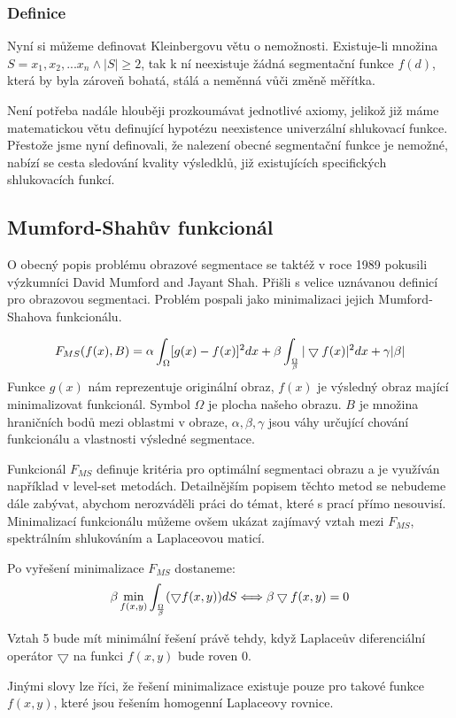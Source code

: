 \documentclass[czech, master, public, dept460, male, cpdeclaration, oneside]{diploma}
\begin{document}
\subsubsection{Definice}
Nyní si můžeme definovat Kleinbergovu větu o nemožnosti. Existuje-li množina $S = {x_1, x_2, ... x_n} \wedge |S|  \geq 2$, tak k ní neexistuje žádná segmentační funkce $f(d)$, která by byla zároveň bohatá, stálá a neměnná vůči změně měřítka.\par
Není potřeba nadále hlouběji prozkoumávat jednotlivé axiomy, jelikož již máme matematickou větu definující hypotézu neexistence univerzální shlukovací funkce. Přestože jsme nyní definovali, že nalezení obecné segmentační funkce je nemožné, nabízí se cesta sledování kvality výsledklů, již existujících specifických shlukovacích funkcí.

\subsection{Mumford-Shahův funkcionál}
O obecný popis problému obrazové segmentace se taktéž v roce 1989 pokusili výzkumníci David Mumford and Jayant Shah. Přišli s velice uznávanou definicí pro obrazovou segmentaci. Problém pospali jako minimalizaci jejich Mumford-Shahova funkcionálu. \cite{Mumford}

\begin{equation}
\vspace*{+3.0mm}
 F_{MS}(f(x), B) =  \alpha \int_{\Omega} [g(x) - f(x)]^2 dx + \beta  \int_{\frac{\Omega}{\beta}} |\bigtriangledown f(x)|^2 dx + \gamma |\beta|
\end{equation}
Funkce $g(x)$ nám reprezentuje originální obraz, $f(x)$ je výsledný obraz mající minimalizovat funkcionál. Symbol $\Omega$ je plocha našeho obrazu. $B$ je množina hraničních bodů mezi oblastmi v obraze, $\alpha, \beta, \gamma$ jsou váhy určující chování funkcionálu a vlastnosti výsledné segmentace.\par
Funkcionál $F_{MS}$ definuje kritéria pro optimální segmentaci obrazu a je využíván například v level-set metodách. Detailnějším popisem těchto metod se nebudeme dále zabývat, abychom nerozváděli práci do témat, které s prací přímo nesouvisí. Minimalizací funkcionálu můžeme ovšem ukázat zajímavý vztah mezi $F_{MS}$, spektrálním shlukováním a Laplaceovou maticí.\par
Po vyřešení minimalizace $F_{MS}$ dostaneme:
\begin{equation}
\vspace*{+3.0mm}
\beta \min\limits_{f(x,y)}  \int_{\frac{\Omega}{\beta}} (\bigtriangledown f(x, y))dS \Longleftrightarrow \beta \bigtriangledown f(x,y) = 0
\end{equation}
\begin{definition}
	Vztah 5 bude mít minimální řešení právě tehdy, když Laplaceův diferenciální operátor $\bigtriangledown$ na funkci $f(x, y)$ bude roven 0.
\end{definition}
Jinými slovy lze říci, že řešení minimalizace existuje pouze pro takové funkce $f(x,y)$, které jsou řešením homogenní Laplaceovy rovnice. \cite{Pecha}
\end{document}

